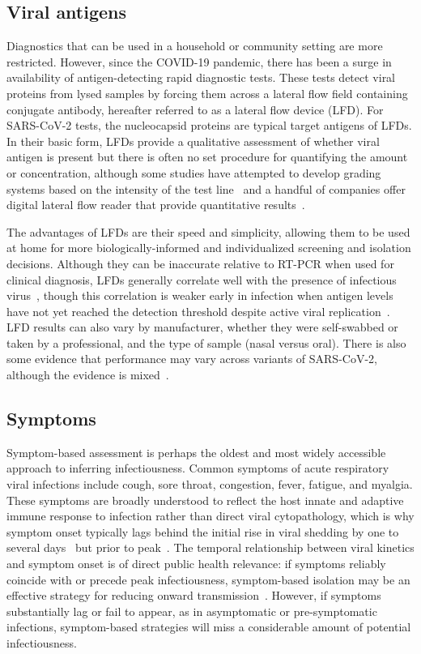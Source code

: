 \documentclass[12pt]{article}
\begin{document}
\subsection{Viral antigens}
Diagnostics that can be used in a household or community setting are more restricted. However, since the COVID-19 pandemic, there has been a surge in availability of antigen-detecting rapid diagnostic tests. These tests detect viral proteins from lysed samples by forcing them across a lateral flow field containing conjugate antibody, hereafter referred to as a lateral flow device (LFD). For SARS-CoV-2 tests, the nucleocapsid proteins are typical target antigens of LFDs. In their basic form, LFDs provide a qualitative assessment of whether viral antigen is present but there is often no set procedure for quantifying the amount or concentration, although some studies have attempted to develop grading systems based on the intensity of the test line~\cite{toptan2021evaluation,routsias2021diagnostic} and a handful of companies offer digital lateral flow reader that provide quantitative results~\cite{joung2022rapid}. 

The advantages of LFDs are their speed and simplicity, allowing them to be used at home for more biologically-informed and individualized screening and isolation decisions. Although they can be inaccurate relative to RT-PCR when used for clinical diagnosis, LFDs generally correlate well with the presence of infectious virus~\cite{pickering2021comparative}, though this correlation is weaker early in infection when antigen levels have not yet reached the detection threshold despite active viral replication~\cite{hakki2022onset}. LFD results can also vary by manufacturer, whether they were self-swabbed or taken by a professional, and the type of sample (nasal versus oral). There is also some evidence that performance may vary across variants of SARS-CoV-2, although the evidence is mixed~\cite{eyre2023performance}.

\subsection{Symptoms}
Symptom-based assessment is perhaps the oldest and most widely accessible approach to inferring infectiousness. Common symptoms of acute respiratory viral infections include cough, sore throat, congestion, fever, fatigue, and myalgia. These symptoms are broadly understood to reflect the host innate and adaptive immune response to infection rather than direct viral cytopathology, which is why symptom onset typically lags behind the initial rise in viral shedding by one to several days~\cite{puhach2022infectious} but prior to peak~\cite{hakki2022onset}. The temporal relationship between viral kinetics and symptom onset is of direct public health relevance: if symptoms reliably coincide with or precede peak infectiousness, symptom-based isolation may be an effective strategy for reducing onward transmission~\cite{fraser2004factors}. However, if symptoms substantially lag or fail to appear, as in asymptomatic or pre-symptomatic infections, symptom-based strategies will miss a considerable amount of potential infectiousness.
\end{document}
